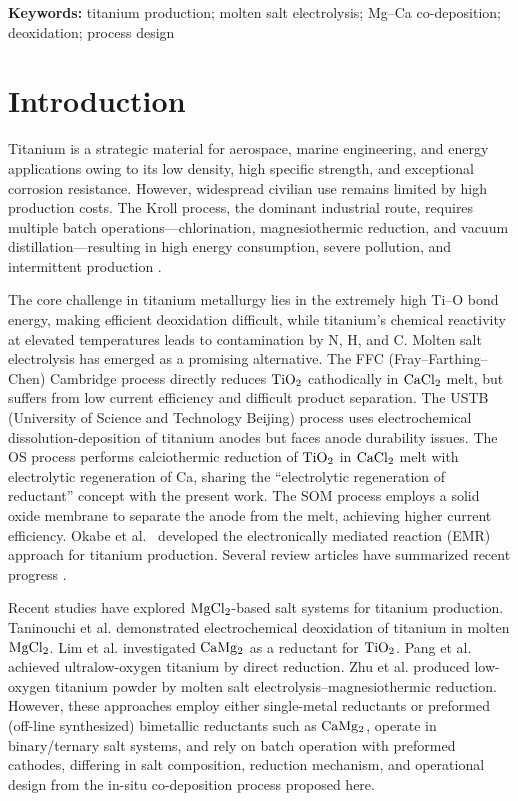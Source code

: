 \documentclass[11pt]{article}
\begin{document}
{\small\noindent\textbf{Keywords:} titanium production; molten salt electrolysis; Mg--Ca co-deposition; deoxidation; process design\par}

\newpage

\section*{Introduction}

Titanium is a strategic material for aerospace, marine engineering, and energy applications owing to its low density, high specific strength, and exceptional corrosion resistance. However, widespread civilian use remains limited by high production costs. The Kroll process, the dominant industrial route, requires multiple batch operations---chlorination, magnesiothermic reduction, and vacuum distillation---resulting in high energy consumption, severe pollution, and intermittent production \cite{kroll1937,ji2026}.

The core challenge in titanium metallurgy lies in the extremely high Ti--O bond energy, making efficient deoxidation difficult, while titanium's chemical reactivity at elevated temperatures leads to contamination by N, H, and C. Molten salt electrolysis has emerged as a promising alternative. The FFC (Fray--Farthing--Chen) Cambridge process \cite{fray2000} directly reduces $\ce{TiO2}$ cathodically in $\ce{CaCl2}$ melt, but suffers from low current efficiency and difficult product separation. The USTB (University of Science and Technology Beijing) process \cite{jiao2023} uses electrochemical dissolution-deposition of titanium anodes but faces anode durability issues. The OS process \cite{ono2002} performs calciothermic reduction of $\ce{TiO2}$ in $\ce{CaCl2}$ melt with electrolytic regeneration of Ca, sharing the ``electrolytic regeneration of reductant'' concept with the present work. The SOM process \cite{pal2001} employs a solid oxide membrane to separate the anode from the melt, achieving higher current efficiency. Okabe et al.\ \cite{okabe1997} developed the electronically mediated reaction (EMR) approach for titanium production. Several review articles have summarized recent progress \cite{ji2026,zhang2024}.

Recent studies have explored $\ce{MgCl2}$-based salt systems for titanium production. Taninouchi et al. \cite{taninouchi2016} demonstrated electrochemical deoxidation of titanium in molten $\ce{MgCl2}$. Lim et al. \cite{lee2025} investigated $\ce{CaMg2}$ as a reductant for $\ce{TiO2}$. Pang et al. \cite{pang2024} achieved ultralow-oxygen titanium by direct reduction. Zhu et al. \cite{xu2025} produced low-oxygen titanium powder by molten salt electrolysis--magnesiothermic reduction. However, these approaches employ either single-metal reductants or preformed (off-line synthesized) bimetallic reductants such as $\ce{CaMg2}$, operate in binary/ternary salt systems, and rely on batch operation with preformed cathodes, differing in salt composition, reduction mechanism, and operational design from the in-situ co-deposition process proposed here.
\end{document}
